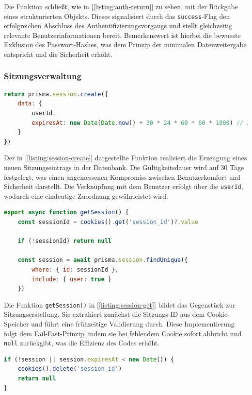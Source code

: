 Die Funktion schließt, wie in [\ref{listing:auth-return}] zu sehen, mit der Rückgabe eines strukturierten Objekts. Dieses signalisiert durch das \texttt{success}-Flag den erfolgreichen Abschluss des Authentifizierungsvorgangs und stellt gleichzeitig relevante Benutzerinformationen bereit. Bemerkenswert ist hierbei die bewusste Exklusion des Passwort-Hashes, was dem Prinzip der minimalen Datenweitergabe entspricht und die Sicherheit erhöht.

\subsubsection{Sitzungsverwaltung}

\begin{lstlisting}[language=JavaScript, caption={Erstellung einer neuen Sitzung.}, label={listing:session-create}]
return prisma.session.create({
	data: {
		userId,
		expiresAt: new Date(Date.now() + 30 * 24 * 60 * 60 * 1000) // 30 Tage
	}
})
\end{lstlisting}

Der in [\ref{listing:session-create}] dargestellte Funktion realisiert die Erzeugung eines neuen Sitzungseintrags in der Datenbank. Die Gültigkeitsdauer wird auf 30 Tage festgelegt, was einen angemessenen Kompromiss zwischen Benutzerkomfort und Sicherheit darstellt. Die Verknüpfung mit dem Benutzer erfolgt über die \texttt{userId}, wodurch eine eindeutige Zuordnung gewährleistet wird.

\begin{lstlisting}[language=JavaScript, caption={Abrufen einer bestehenden Sitzung.}, label={listing:session-get}]
export async function getSession() {
	const sessionId = cookies().get('session_id')?.value
		
	if (!sessionId) return null
		
	const session = await prisma.session.findUnique({
		where: { id: sessionId },
		include: { user: true }
	})
\end{lstlisting}

	
	Die Funktion \texttt{getSession()} in [\ref{listing:session-get}] bildet das Gegenstück zur Sitzungserstellung. Sie extrahiert zunächst die Sitzungs-ID aus dem Cookie-Speicher und führt eine frühzeitige Validierung durch. Diese Implementierung folgt dem Fail-Fast-Prinzip, indem sie bei fehlendem Cookie sofort abbricht und \texttt{null} zurückgibt, was die Effizienz des Codes erhöht.
	
\begin{lstlisting}[language=JavaScript, caption={Validierung der Sitzungsgültigkeit.}, label={listing:session-validate}]
if (!session || session.expiresAt < new Date()) {
	cookies().delete('session_id')
	return null
}
\end{lstlisting}


